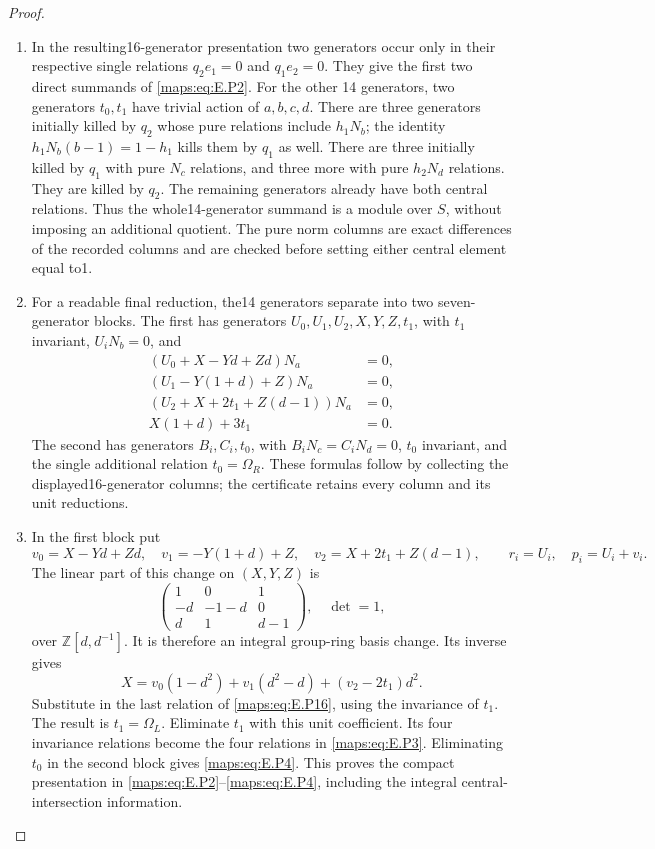 \begin{proof}
\begin{enumerate}[label=\arabic*.,leftmargin=*]
\item In the resulting16-generator presentation two
generators occur only in their respective single
relations $q_2e_1=0$ and $q_1e_2=0$. They give the
first two direct summands of \eqref{maps:eq:E.P2}. For the other
14 generators, two generators $t_0,t_1$ have
trivial action of $a,b,c,d$. There are three
generators initially killed by $q_2$ whose pure
relations include $h_1N_b$; the identity
$h_1N_b(b-1)=1-h_1$ kills them by $q_1$ as well.
There are three initially killed by $q_1$ with
pure $N_c$ relations, and three more with pure
$h_2N_d$ relations. They are killed by $q_2$.
The remaining generators already have both
central relations. Thus the whole14-generator
summand is a module over $S$, without imposing
an additional quotient. The pure norm columns
are exact differences of the recorded columns
and are checked before setting either central
element equal to1.

\item For a readable final reduction, the14 generators
separate into two seven-generator blocks. The
first has generators $U_0,U_1,U_2,X,Y,Z,t_1$,
with $t_1$ invariant, $U_iN_b=0$, and
\[
 \begin{split}
 (U_0+X-Yd+Zd)N_a&=0,\\
 (U_1-Y(1+d)+Z)N_a&=0,\\
 (U_2+X+2t_1+Z(d-1))N_a&=0,\\
 X(1+d)+3t_1&=0.
 \end{split}
 \tag{E.P16}\label{maps:eq:E.P16}
\]
The second has generators $B_i,C_i,t_0$, with
$B_iN_c=C_iN_d=0$, $t_0$ invariant, and the single
additional relation $t_0=\Omega_R$. These formulas
follow by collecting the displayed16-generator
columns; the certificate retains every column
and its unit reductions.

\item In the first block put
\[
 v_0=X-Yd+Zd,\quad v_1=-Y(1+d)+Z,
 \quad v_2=X+2t_1+Z(d-1),\qquad
 r_i=U_i,\quad p_i=U_i+v_i.
 \tag{E.P17}\label{maps:eq:E.P17}
\]
The linear part of this change on $(X,Y,Z)$ is
\[
 \begin{pmatrix}1&0&1\\-d&-1-d&0\\d&1&d-1\end{pmatrix},
 \quad\det=1,
\]
over $\mathbb Z[d,d^{-1}]$. It is therefore an
integral group-ring basis change. Its inverse gives
\[
 X=v_0(1-d^2)+v_1(d^2-d)+(v_2-2t_1)d^2.
\]
Substitute in the last relation of \eqref{maps:eq:E.P16}, using
the invariance of $t_1$. The result is
$t_1=\Omega_L$. Eliminate $t_1$ with this unit
coefficient. Its four invariance relations become
the four relations in \eqref{maps:eq:E.P3}. Eliminating $t_0$
in the second block gives \eqref{maps:eq:E.P4}. This proves the
compact presentation in \eqref{maps:eq:E.P2}--\eqref{maps:eq:E.P4}, including
the integral central-intersection information.


\end{enumerate}
\end{proof}
